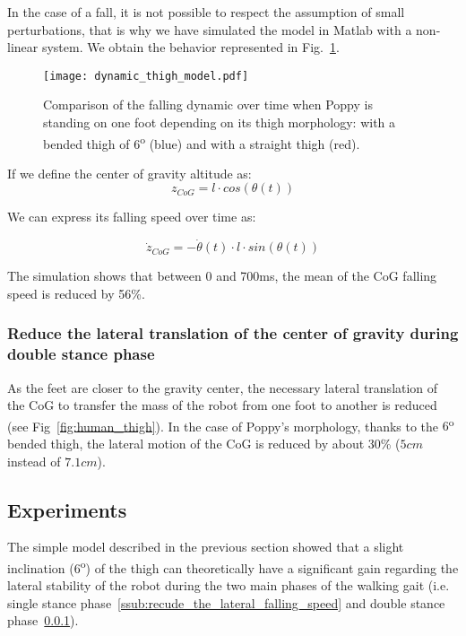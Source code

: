 In the case of a fall, it is not possible to respect the assumption of small perturbations, that is
why we have simulated the model in Matlab with a non-linear system.
We obtain the behavior
represented in Fig.~\ref{fig:dynamic_thigh_model}.

\begin{figure}[thpb]
    \centering
    \texttt{[image: dynamic\_thigh\_model.pdf]}
    \caption{Comparison of the falling dynamic over time when Poppy is standing on one foot depending on  its thigh morphology: with a bended thigh of 6\textsuperscript{o} (blue) and with a straight thigh (red).}
    \label{fig:dynamic_thigh_model}
\end{figure}

If we define the center of gravity altitude as:
$$ z_{CoG} = l \cdot cos(\theta(t)) $$


We can express its falling speed over time as:

$$ \dot{z}_{CoG} = - \dot{\theta}(t) \cdot l \cdot sin(\theta(t))$$


The simulation shows that between 0 and 700ms, the mean of the CoG falling speed is reduced by 56\%.

\subsubsection{Reduce the lateral translation of the center of gravity during double stance phase} %
\label{ssub:reduce_the_lateral_translation_of_the_center_of_gravity}

As the feet are closer to the gravity center, the necessary lateral translation of the CoG to transfer the mass of the robot from one foot to another is reduced (see Fig~\ref{fig:human_thigh}).
In the case of Poppy's morphology, thanks to the $6$\textsuperscript{o} bended thigh, the lateral motion of the CoG is reduced by about 30\% ($ 5 cm$ instead of $7.1 cm$).


\subsection{Experiments} %
\label{sub:experiments}
The simple model described in the previous section showed that a slight inclination
(6\textsuperscript{o}) of the thigh can theoretically have a significant gain regarding the lateral
stability of the robot during the two main phases of the walking gait (i.e.
single stance
phase~\ref{ssub:recude_the_lateral_falling_speed} and double stance
phase~\ref{ssub:reduce_the_lateral_translation_of_the_center_of_gravity}).

